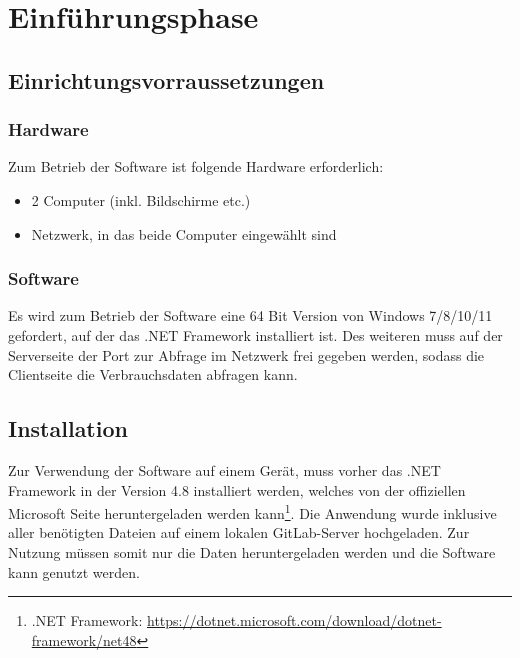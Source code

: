 \section{Einführungsphase}
\label{sec:Einfuehrungsphase}

\subsection{Einrichtungsvorraussetzungen}
\label{sec:Einrichtungsvorraussetzungen}

\subsubsection{Hardware}
\label{sec:HardwareEinrichtung}
Zum Betrieb der Software ist folgende Hardware erforderlich:

\begin{itemize}
	\item 2 Computer (inkl. Bildschirme etc.)
	\item Netzwerk, in das beide Computer eingewählt sind
\end{itemize}

\subsubsection{Software}
\label{sec:SoftwareEinrichtung}
Es wird zum Betrieb der Software eine 64 Bit Version von Windows 7/8/10/11 gefordert, auf der das .NET Framework installiert ist. Des weiteren muss auf der Serverseite der Port zur Abfrage im Netzwerk frei gegeben werden, sodass die Clientseite die Verbrauchsdaten abfragen kann.

\subsection{Installation}
\label{sec:Installation}
Zur Verwendung der Software auf einem Gerät, muss vorher das .NET Framework in der Version 4.8 installiert werden, welches von der offiziellen Microsoft Seite heruntergeladen werden kann\footnote{.NET Framework: \url{https://dotnet.microsoft.com/download/dotnet-framework/net48}}. Die Anwendung wurde inklusive aller benötigten Dateien auf einem lokalen {\acs{GitLab}}-Server hochgeladen. Zur Nutzung müssen somit nur die Daten heruntergeladen werden und die Software kann genutzt werden.
